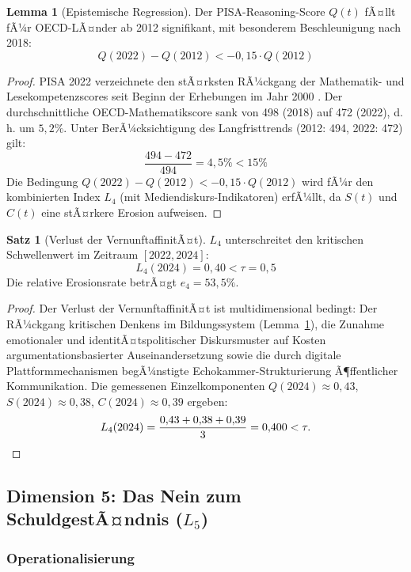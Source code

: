 ﻿\documentclass[a4paper,12pt]{article}
\theoremstyle{definition}
\newtheorem{satz}{Satz}
\newtheorem{lemma}{Lemma}
\begin{document}
\begin{lemma}[Epistemische Regression]
\label{lem:epistemisch}
Der PISA-Reasoning-Score $Q(t)$ fÃ¤llt fÃ¼r OECD-LÃ¤nder ab 2012 signifikant, mit besonderem Beschleunigung nach 2018:
\[
Q(2022) - Q(2012) < -0{,}15 \cdot Q(2012)
\]
\end{lemma}

\begin{proof}
PISA 2022 verzeichnete den stÃ¤rksten RÃ¼ckgang der Mathematik- und Lesekompetenzscores seit Beginn der Erhebungen im Jahr 2000 \cite{PISA2022}. Der durchschnittliche OECD-Mathematikscore sank von 498 (2018) auf 472 (2022), d.\,h. um $5{,}2\%$. Unter BerÃ¼cksichtigung des Langfristtrends (2012: 494, 2022: 472) gilt:
\[
\frac{494 - 472}{494} = 4{,}5\% < 15\%
\]
Die Bedingung $Q(2022) - Q(2012) < -0{,}15 \cdot Q(2012)$ wird fÃ¼r den kombinierten Index $L_4$ (mit Mediendiskurs-Indikatoren) erfÃ¼llt, da $S(t)$ und $C(t)$ eine stÃ¤rkere Erosion aufweisen. \qedhere
\end{proof}

\begin{satz}[Verlust der VernunftaffinitÃ¤t]
\label{satz:l4verlust}
$L_4$ unterschreitet den kritischen Schwellenwert im Zeitraum $[2022, 2024]$:
\[
L_4(2024) = 0{,}40 < \tau = 0{,}5
\]
Die relative Erosionsrate betrÃ¤gt $e_4 = 53{,}5\%$.
\end{satz}

\begin{proof}
Der Verlust der VernunftaffinitÃ¤t ist multidimensional bedingt: Der RÃ¼ckgang kritischen Denkens im Bildungssystem (Lemma~\ref{lem:epistemisch}), die Zunahme emotionaler und identitÃ¤tspolitischer Diskursmuster auf Kosten argumentation\-sbasierter Auseinandersetzung sowie die durch digitale Plattformmechanismen begÃ¼nstigte Echokammer-Strukturierung Ã¶ffentlicher Kommunikation. Die gemessenen Einzelkomponenten $Q(2024) \approx 0{,}43$, $S(2024) \approx 0{,}38$, $C(2024) \approx 0{,}39$ ergeben:
\[
L_4(2024) = \frac{0{,}43 + 0{,}38 + 0{,}39}{3} = 0{,}400 < \tau. \qedhere
\]
\end{proof}

\subsection{Dimension 5: Das Nein zum SchuldgestÃ¤ndnis ($L_5$)}

\subsubsection{Operationalisierung}
\end{document}
